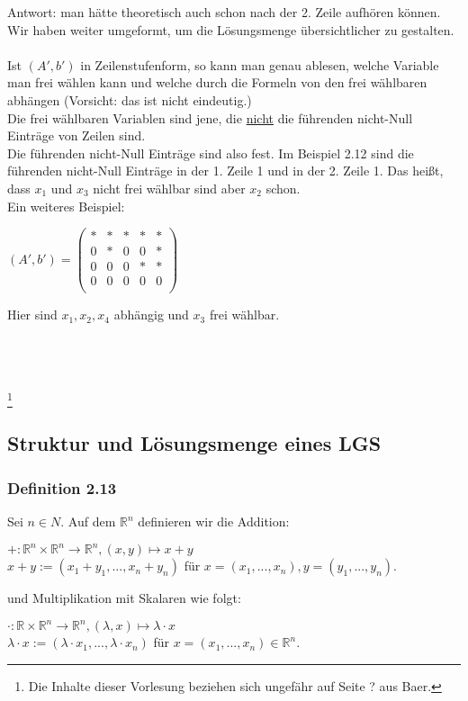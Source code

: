 \documentclass{article}
\begin{document}
Antwort: man hätte theoretisch auch schon nach der 2. Zeile aufhören können. Wir haben weiter umgeformt, um die Lösungsmenge übersichtlicher zu gestalten. \\
\\
Ist $(A',b')$ in Zeilenstufenform, so kann man genau ablesen, welche Variable man frei wählen kann und welche durch die Formeln von den frei wählbaren abhängen (Vorsicht: das ist nicht eindeutig.) \\
Die frei wählbaren Variablen sind jene, die \underline{nicht} die führenden nicht-Null Einträge von Zeilen sind. \\
Die führenden nicht-Null Einträge sind also fest. Im Beispiel 2.12 sind die führenden nicht-Null Einträge in der 1. Zeile 1 und in der 2. Zeile 1. Das heißt, dass $x_1$ und $x_3$ nicht frei wählbar sind aber $x_2$ schon. \\
Ein weiteres Beispiel: \\
\begin{center}
    $(A',b') = \begin{pmatrix}
        * & * & * & * & * \\
        0 & * & 0 & 0 & * \\
        0 & 0 & 0 & * & * \\
        0 & 0 & 0 & 0 & 0 \\
    \end{pmatrix}$
\end{center}
Hier sind $x_1, x_2, x_4$ abhängig und $x_3$ frei wählbar. \\
\\
\\
\\
\date{Donnerstag, 09.11.23} \footnote[1]{Die Inhalte dieser Vorlesung beziehen sich ungefähr auf Seite ? aus Baer.} \\

\subsection{Struktur und Lösungsmenge eines LGS}
\subsubsection*{Definition 2.13}
Sei $n \in N$. Auf dem $\mathbb{R}^n$ definieren wir die Addition:\\
\begin{center}
    $+: \mathbb{R}^n \times \mathbb{R}^n \rightarrow \mathbb{R}^n, (x,y) \mapsto x+y$ \\
    $x+y:= (x_1+y_1, ..., x_n+y_n)$ für $ x=(x_1, ..., x_n), y=(y_1, ..., y_n).$ \\
\end{center}
und Multiplikation mit Skalaren wie folgt: \\
\begin{center}
    $\cdot: \mathbb{R} \times \mathbb{R}^n \rightarrow \mathbb{R}^n, (\lambda, x) \mapsto \lambda \cdot x$ \\
    $\lambda \cdot x := (\lambda \cdot x_1, ..., \lambda \cdot x_n)$ für $ x=(x_1, ..., x_n) \in \mathbb{R}^n.$ \\
\end{center}
\end{document}
